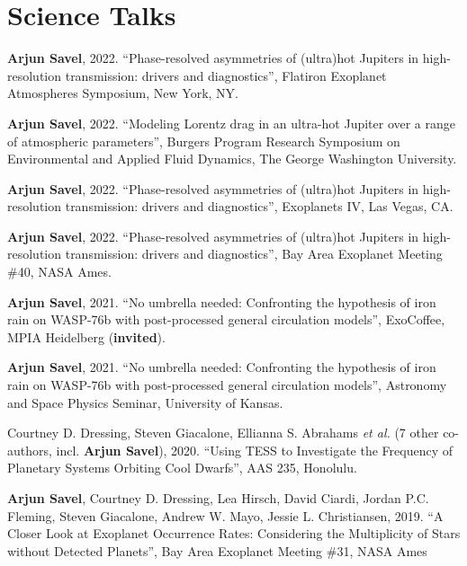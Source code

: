 \documentclass[letterpaper,10.5pt]{article}
\newcommand{\resumeSubHeadingListStart}{\begin{itemize}[leftmargin=*]}
\newcommand{\shorterSection}[1]{\vspace{-10pt}\section{#1}}
\begin{document}
\shorterSection{Science Talks}
\small
  \begin{list}{}{\cvlist}
  
\item[{\color{numcolor}\scriptsize10}] \textbf{Arjun Savel}, 2022. ``Phase-resolved asymmetries of (ultra)hot Jupiters in high-resolution transmission: drivers and diagnostics'', Flatiron Exoplanet Atmospheres Symposium, New York, NY.
  
  \item[{\color{numcolor}\scriptsize9}] \textbf{Arjun Savel}, 2022. ``Modeling Lorentz drag in an ultra-hot Jupiter over a range of atmospheric parameters'', Burgers Program Research Symposium on Environmental and Applied Fluid Dynamics, The George Washington University.
  
     \item[{\color{numcolor}\scriptsize8}] \textbf{Arjun Savel}, 2022. ``Phase-resolved asymmetries of (ultra)hot Jupiters in high-resolution transmission: drivers and diagnostics'', Exoplanets IV, Las Vegas, CA.
  
  
   \item[{\color{numcolor}\scriptsize7}] \textbf{Arjun Savel}, 2022. ``Phase-resolved asymmetries of (ultra)hot Jupiters in high-resolution transmission: drivers and diagnostics'', Bay Area Exoplanet Meeting \#40, NASA Ames.
  
 \item[{\color{numcolor}\scriptsize6}] \textbf{Arjun Savel}, 2021. ``No umbrella needed: Confronting the hypothesis of iron rain on WASP-76b with post-processed general circulation models'', ExoCoffee, MPIA Heidelberg (\textbf{invited}).
  
\item[{\color{numcolor}\scriptsize5}] \textbf{Arjun Savel}, 2021. ``No umbrella needed: Confronting the hypothesis of iron rain on WASP-76b with post-processed general circulation models'', Astronomy and Space Physics Seminar, University of Kansas.

  
\item[{\color{numcolor}\scriptsize4}] Courtney D. Dressing, Steven Giacalone, Ellianna S. Abrahams \emph{et al.} (7 other co-authors, incl. \textbf{Arjun Savel}), 2020. ``Using TESS to Investigate the Frequency of Planetary Systems Orbiting Cool Dwarfs'', AAS 235, Honolulu.


\item[{\color{numcolor}\scriptsize3}] \textbf{Arjun Savel}, Courtney D. Dressing, Lea Hirsch, David Ciardi, Jordan P.C. Fleming, Steven Giacalone, Andrew W. Mayo, Jessie L. Christiansen, 2019. “A Closer Look at Exoplanet Occurrence Rates: Considering the Multiplicity of Stars without Detected Planets”, Bay Area Exoplanet Meeting \#31, NASA Ames


\end{list}
\end{document}
